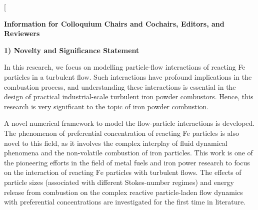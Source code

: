 \documentclass[twocolumn,10pt,dvipsnames]{article} %
\newcommand{\mrm}[1]{\mathrm{#1}}
\begin{document}
\clearpage

\twocolumn[\begin{@twocolumnfalse}

\centerline{\bf Information for Colloquium Chairs and Cochairs, Editors, and Reviewers}

\vspace{20pt}

{\bf 1) Novelty and Significance Statement}
\vspace{10pt}

In this research, we focus on modelling particle-flow interactions of reacting Fe particles in a turbulent flow. Such interactions have profound implications in the combustion process, and understanding these interactions is essential in the design of practical industrial-scale turbulent iron powder combustors. Hence, this research is very significant to the topic of iron powder combustion.

\vspace{10pt}

A novel numerical framework to model the flow-particle interactions is developed. The phenomenon of preferential concentration of reacting Fe particles is also novel to this field, as it involves the complex interplay of fluid dynamical phenomena and the non-volatile combustion of iron particles. This work is one of the pioneering efforts in the field of metal fuels and iron power research to focus on the interaction of reacting $\mrm{Fe}$ particles with turbulent flows. The effects of particle sizes (associated with different Stokes-number regimes) and energy release from combustion on the complex reactive particle-laden flow dynamics with preferential concentrations are investigated for the first time in literature.


\end{@twocolumnfalse}
\end{document}
